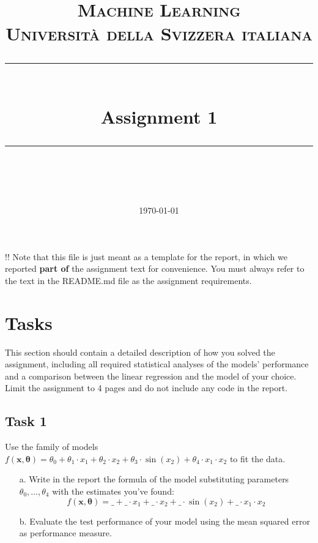 \documentclass[11pt]{scrartcl}
\title{	
	\normalfont\normalsize
	\textsc{Machine Learning\\%
	Universit\`a della Svizzera italiana}\\
	\vspace{25pt}
	\rule{\linewidth}{0.5pt}\\
	\vspace{20pt}
	{\huge Assignment 1}\\
	\vspace{12pt}
	\rule{\linewidth}{1pt}\\
	\vspace{12pt}
}
\author{\LARGE \thestudent}
\date{\normalsize\today}
\begin{document}
\maketitle


\noindent !! Note that this file is just meant as a template for the report, in which we reported \textbf{part of} the assignment text for convenience. You must always refer to the text in the README.md file as the assignment requirements.


\section*{Tasks}

This section should contain a detailed description of how you solved the assignment, including all required statistical analyses of the models' performance and a comparison between the linear regression and the model of your choice. Limit the assignment to 4 pages and do not include any code in the report.

\subsection*{Task 1}
Use the family of models $f(\mathbf{x}, \boldsymbol{\theta}) = \theta_0 + \theta_1 \cdot x_1 + \theta_2 \cdot x_2 + \theta_3 \cdot \sin(x_2) + \theta_4 \cdot x_1 \cdot x_2$ to fit the data. 

\begin{itemize}
	\item [a.] Write in the report the formula of the model substituting parameters $\theta_0, \ldots, \theta_4$ with the estimates you've found:
	$$f(\mathbf{x}, \boldsymbol{\theta}) = \_ + \_ \cdot x_1 + \_ \cdot x_2 + \_ \cdot \sin(x_2) + \_ \cdot x_1 \cdot x_2$$
	\item [b.] Evaluate the test performance of your model using the mean squared error as performance measure.
\end{itemize}
\end{document}

